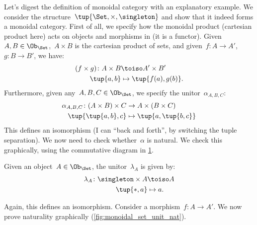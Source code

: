 \begin{example}
    Let's digest the definition of monoidal category with an explanatory example. We consider the structure~$\tup{\Set,\times,\singleton}$ and show that it indeed forms a monoidal category. First of all, we specify how the monoidal product (cartesian product here) acts on objects and morphisms in \Set (it is a functor). Given~$A,B\in \Ob_{\Set}$,~$A\times B$ is the cartesian product of sets, and given~$f\colon A\to A'$,~$g\colon B\to B'$, we have:
    \begin{equation*}
        \begin{aligned}
        (f\times g)
            \colon A\times B&\toiso A'\times B'\\
            \tup{a,b}&\mapsto \tup{f(a),g(b)}.
        \end{aligned}
    \end{equation*}
    Furthermore, given any~$A,B,C\in \Ob_{\Set}$, we specify the unitor~$\alpha_{A,B,C}$:
    \begin{equation*}
        \begin{aligned}
            \alpha_{A,B,C}\colon (A\times B)\times C&\to A\times (B\times C)\\
            \tup{\tup{a,b},c}&\mapsto \tup{a,\tup{b,c}}
        \end{aligned}
    \end{equation*}
    This defines an isomorphism (I can ``back and forth'', by switching the tuple separation). We now need to check whether~$\alpha$ is natural. We check this graphically, using the commutative diagram in \cref{fig:monoidal_set_ass_nat}.

    \begin{figure}[h!]
        \begin{center}
        \end{center}
        \caption{\label{fig:monoidal_set_ass_nat}}
    \end{figure}

    Given an object~$A\in \Ob_\Set$, the unitor~$\lambda_A$ is given by:
    \begin{equation*}
        \begin{aligned}
            \lambda_A\colon \singleton \times A &\toiso A\\
            \tup{\ast,a}&\mapsto a.
        \end{aligned}
    \end{equation*}

    Again, this defines an isomorphism. Consider a morphism~$f\colon A\to A'$. We now prove naturality graphically (\cref{fig:monoidal_set_unit_nat}).


\end{example}
